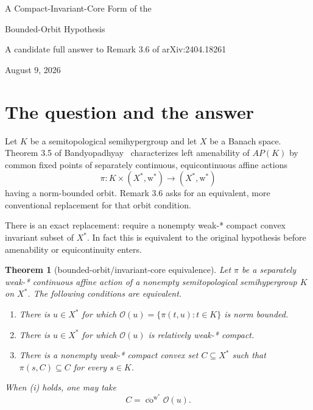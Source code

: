 \documentclass[10pt]{article}
\newtheorem{theorem}{Theorem}
\newcommand{\wstar}{\mathrm{w}^*}
\newcommand{\Orb}{\mathcal O}
\begin{document}
\begin{center}
{\LARGE A Compact-Invariant-Core Form of the}\par\vspace{0.15em}
{\LARGE Bounded-Orbit Hypothesis}\par\vspace{0.45em}
{\large A candidate full answer to Remark 3.6 of arXiv:2404.18261}\par\vspace{0.2em}
August 9, 2026
\end{center}

\begin{center}
\end{center}

\section*{The question and the answer}

Let $K$ be a semitopological semihypergroup and let $X$ be a Banach space.
Theorem 3.5 of Bandyopadhyay~\cite{Bandyopadhyay2024} characterizes left
amenability of $AP(K)$ by common fixed points of separately continuous,
equicontinuous affine actions
\[
   \pi:K\times (X^*,\wstar)\longrightarrow (X^*,\wstar)
\]
having a norm-bounded orbit.  Remark 3.6 asks for an equivalent, more
conventional replacement for that orbit condition.

There is an exact replacement: require a nonempty weak-* compact convex
invariant subset of $X^*$.  In fact this is equivalent to the original
hypothesis before amenability or equicontinuity enters.

\begin{theorem}[bounded-orbit/invariant-core equivalence]\label{thm:core}
Let $\pi$ be a separately weak-* continuous affine action of a nonempty
semitopological semihypergroup $K$ on $X^*$.  The following conditions are
equivalent.
\begin{enumerate}
\item[(i)] There is $u\in X^*$ for which
  $\Orb(u)=\{\pi(t,u):t\in K\}$ is norm bounded.
\item[(ii)] There is $u\in X^*$ for which $\Orb(u)$ is relatively weak-*
  compact.
\item[(iii)] There is a nonempty weak-* compact convex set $C\subseteq X^*$
  such that $\pi(s,C)\subseteq C$ for every $s\in K$.
\end{enumerate}
When (i) holds, one may take
\[
             C=\overline{\operatorname{co}}^{\wstar}\Orb(u).
\]
\end{theorem}
\end{document}
